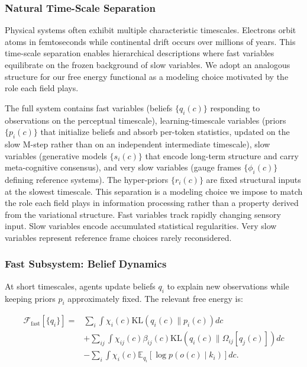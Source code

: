 \documentclass[11pt]{article}
\begin{document}
\subsubsection{Natural Time-Scale Separation}

Physical systems often exhibit multiple characteristic timescales. Electrons orbit atoms in femtoseconds while continental drift occurs over millions of years. This time-scale separation enables hierarchical descriptions where fast variables equilibrate on the frozen background of slow variables. We adopt an analogous structure for our free energy functional as a modeling choice motivated by the role each field plays.

The full system contains fast variables (beliefs $\{q_i(c)\}$ responding to observations on the perceptual timescale), learning-timescale variables (priors $\{p_i(c)\}$ that initialize beliefs and absorb per-token statistics, updated on the slow M-step rather than on an independent intermediate timescale), slow variables (generative models $\{s_i(c)\}$ that encode long-term structure and carry meta-cognitive consensus), and very slow variables (gauge frames $\{\phi_i(c)\}$ defining reference systems). The hyper-priors $\{r_i(c)\}$ are fixed structural inputs at the slowest timescale. This separation is a modeling choice we impose to match the role each field plays in information processing rather than a property derived from the variational structure. Fast variables track rapidly changing sensory input. Slow variables encode accumulated statistical regularities. Very slow variables represent reference frame choices rarely reconsidered.

\subsubsection{Fast Subsystem: Belief Dynamics}

At short timescales, agents update beliefs $q_i$ to explain new observations while keeping priors $p_i$ approximately fixed. The relevant free energy is:

\begin{align}
\mathcal{F}_{\text{fast}}[\{q_i\}] = {}& \sum_i \int \chi_i(c)  \mathrm{KL}(q_i(c) \| p_i(c))  dc \nonumber\\
&+ \sum_{ij} \int \chi_{ij}(c)  \beta_{ij}(c)  \mathrm{KL}(q_i(c) \| \Omega_{ij}[q_j(c)])  dc \nonumber\\
&- \sum_i \int \chi_i(c)  \mathbb{E}_{q_i}[\log p(o(c) \mid k_i)]  dc.
\end{align}
\end{document}
